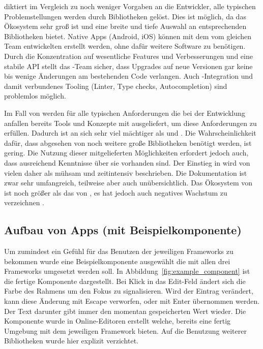  diktiert im Vergleich zu  noch weniger Vorgaben an die Entwickler, alle typischen Problemstellungen werden durch Bibliotheken gelöst. Dies ist möglich, da das Ökosystem sehr groß ist und eine breite und tiefe Auswahl an entsprechenden Bibliotheken bietet. Native Apps (Android, iOS) können mit dem vom gleichen Team entwickelten  erstellt werden, ohne dafür weitere Software zu benötigen. Durch die Konzentration auf wesentliche Features und Verbesserungen und eine stabile API stellt das -Team sicher, dass Upgrades auf neue Versionen gar keine bis wenige Änderungen am bestehenden Code verlangen. Auch -Integration und damit verbundenes Tooling (Linter, Type checks, Autocompletion) sind problemlos möglich.

Im Fall von  werden für alle typischen Anforderungen die bei der Entwicklung anfallen bereits Tools und Konzepte mit ausgeliefert, um diese Anforderungen zu erfüllen. Dadurch ist  an sich sehr viel mächtiger als  und . Die Wahrscheinlichkeit dafür, dass abgesehen von  noch weitere große Bibliotheken benötigt werden, ist gering. Die Nutzung dieser mitgelieferten Möglichkeiten erfordert jedoch auch, dass ausreichend Kenntnisse über sie vorhanden sind. Der Einstieg in  wird von vielen daher als mühsam und zeitintensiv beschrieben. Die Dokumentation ist zwar sehr umfangreich, teilweise aber auch unübersichtlich. Das Ökosystem von  ist noch größer als das von , es hat jedoch auch negatives Wachstum zu verzeichnen \parencite[vgl.][]{npmjs_2018}.

\subsection{Aufbau von Apps (mit Beispielkomponente)}
Um zumindest ein Gefühl für das Benutzen der jeweiligen Frameworks zu bekommen wurde eine Beispielkomponente ausgewählt die mit allen drei Frameworks umgesetzt werden soll. In Abbildung~\ref{fig:example_component} ist die fertige Komponente dargestellt. Bei Klick in das Edit-Feld ändert sich die Farbe des Rahmens um den Fokus zu signalisieren. Wird der Eintrag verändert, kann diese Änderung mit Escape verworfen, oder mit Enter übernommen werden. Der Text darunter gibt immer den momentan gespeicherten Wert wieder. Die Komponente wurde in Online-Editoren erstellt welche, bereits eine fertig Umgebung mit dem jeweiligen Framework bieten. Auf die Benutzung weiterer Bibliotheken wurde hier explizit verzichtet.

